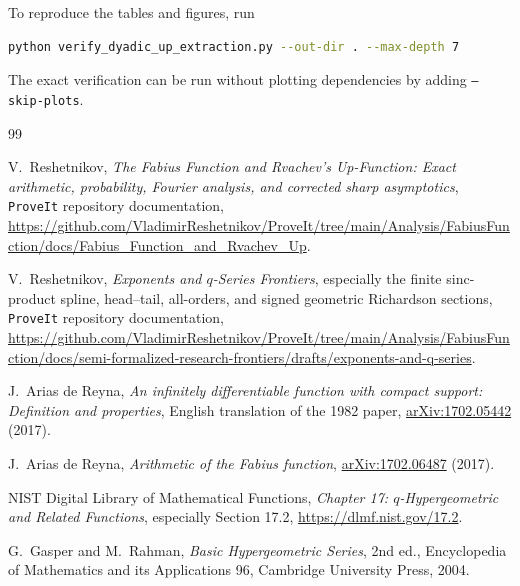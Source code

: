 \documentclass[11pt,oneside]{article}
\numberwithin{equation}{section}
\theoremstyle{definition}
\theoremstyle{remark}
\begin{document}
To reproduce the tables and figures, run
\begin{lstlisting}[style=code,language=bash]
python verify_dyadic_up_extraction.py --out-dir . --max-depth 7
\end{lstlisting}
The exact verification can be run without plotting dependencies by adding
\texttt{--skip-plots}.

\begin{thebibliography}{99}

V.~Reshetnikov,
\emph{The Fabius Function and Rvachev's Up-Function: Exact arithmetic,
probability, Fourier analysis, and corrected sharp asymptotics},
\texttt{ProveIt} repository documentation,
\url{https://github.com/VladimirReshetnikov/ProveIt/tree/main/Analysis/FabiusFunction/docs/Fabius_Function_and_Rvachev_Up}.

V.~Reshetnikov,
\emph{Exponents and $q$-Series Frontiers}, especially the finite sinc-product
spline, head--tail, all-orders, and signed geometric Richardson sections,
\texttt{ProveIt} repository documentation,
\url{https://github.com/VladimirReshetnikov/ProveIt/tree/main/Analysis/FabiusFunction/docs/semi-formalized-research-frontiers/drafts/exponents-and-q-series}.

J.~Arias de Reyna,
\emph{An infinitely differentiable function with compact support: Definition and
properties}, English translation of the 1982 paper,
\href{https://arxiv.org/abs/1702.05442}{arXiv:1702.05442} (2017).

J.~Arias de Reyna,
\emph{Arithmetic of the Fabius function},
\href{https://arxiv.org/abs/1702.06487}{arXiv:1702.06487} (2017).

NIST Digital Library of Mathematical Functions,
\emph{Chapter 17: $q$-Hypergeometric and Related Functions}, especially
Section 17.2,
\url{https://dlmf.nist.gov/17.2}.

G.~Gasper and M.~Rahman,
\emph{Basic Hypergeometric Series}, 2nd ed.,
Encyclopedia of Mathematics and its Applications 96,
Cambridge University Press, 2004.

\end{thebibliography}
\end{document}
